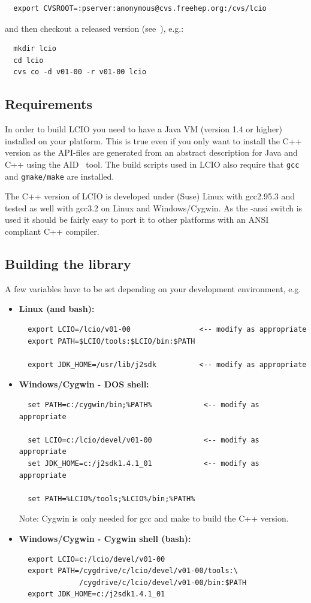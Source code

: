 \documentclass[twoside]{article}
\begin{document}
\begin{verbatim}
  export CVSROOT=:pserver:anonymous@cvs.freehep.org:/cvs/lcio
\end{verbatim}

and then checkout a released version (see~\cite{lcio_home}), e.g.:
\begin{verbatim}
  mkdir lcio 
  cd lcio
  cvs co -d v01-00 -r v01-00 lcio
\end{verbatim}

\subsection{Requirements}
In order to build LCIO you need to have a Java VM (version 1.4 or higher) installed 
on your platform. This is true even if you only want to install the C++ version as the 
API-files are generated from an abstract description for Java and C++ using the 
AID~\cite{ref_aid} tool. The build scripts used in LCIO also require that \verb$gcc$ and 
\verb$gmake/make$ are installed.

The C++ version of LCIO is developed under (Suse) Linux with gcc2.95.3 and tested
as well with gcc3.2 on Linux and Windows/Cygwin. 
As the -ansi switch is used it should be fairly easy to port it to other platforms with
an ANSI compliant C++ compiler.

\subsection {Building the library}

A few variables have to be set depending on your development environment, e.g.
\begin{itemize}
\item{ {\bf Linux (and bash):} 
\begin{verbatim} 
  export LCIO=/lcio/v01-00                <-- modify as appropriate
  export PATH=$LCIO/tools:$LCIO/bin:$PATH

  export JDK_HOME=/usr/lib/j2sdk          <-- modify as appropriate
\end{verbatim} 
}
\item{ {\bf Windows/Cygwin - DOS shell:} 
\begin{verbatim}
  set PATH=c:/cygwin/bin;%PATH%            <-- modify as appropriate

  set LCIO=c:/lcio/devel/v01-00            <-- modify as appropriate
  set JDK_HOME=c:/j2sdk1.4.1_01            <-- modify as appropriate 

  set PATH=%LCIO%/tools;%LCIO%/bin;%PATH%
\end{verbatim}
Note: Cygwin is only needed for gcc and make to build the C++ version.
}
\item{ {\bf Windows/Cygwin - Cygwin shell (bash):} 
\begin{verbatim}
  export LCIO=c:/lcio/devel/v01-00
  export PATH=/cygdrive/c/lcio/devel/v01-00/tools:\
              /cygdrive/c/lcio/devel/v01-00/bin:$PATH
  export JDK_HOME=c:/j2sdk1.4.1_01
\end{verbatim} %
}
\end{itemize}
\end{document}

